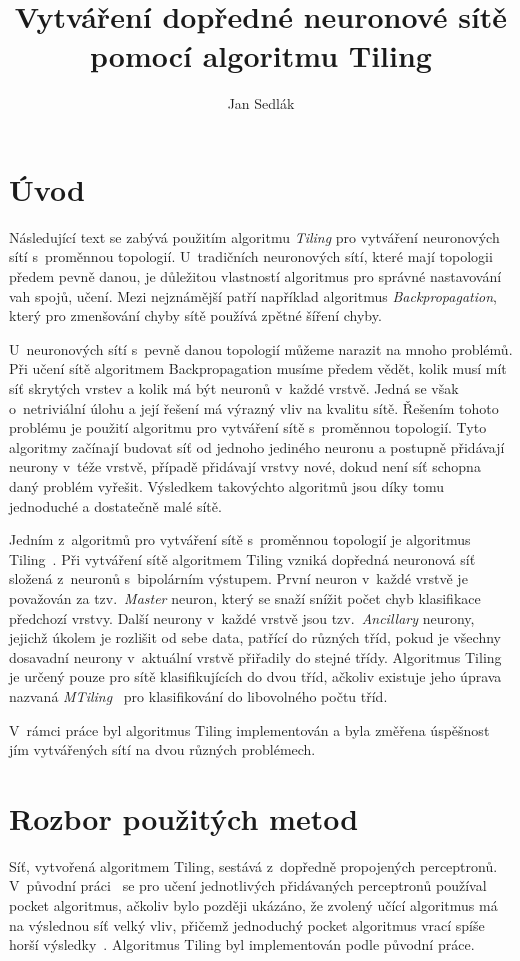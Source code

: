 \documentclass[a4paper, 11pt]{article}
\author{Jan Sedlák}
\title{Vytváření dopředné neuronové sítě pomocí algoritmu Tiling}
\begin{document}
\maketitle
\section{Úvod}
Následující text se zabývá použitím algoritmu \emph{Tiling} pro vytváření neuronových sítí s~proměnnou topologií. U~tradičních neuronových sítí, které mají topologii předem pevně danou, je důležitou vlastností algoritmus pro správné nastavování vah spojů, učení. Mezi nejznámější patří například algoritmus \emph{Backpropagation}, který pro zmenšování chyby sítě používá zpětné šíření chyby.

U~neuronových sítí s~pevně danou topologií můžeme narazit na mnoho problémů. Při učení sítě algoritmem Backpropagation musíme předem vědět, kolik musí mít síť skrytých vrstev a kolik má být neuronů v~každé vrstvě. Jedná se však o~netriviální úlohu a její řešení má výrazný vliv na kvalitu sítě. Řešením tohoto problému je použití algoritmu pro vytváření sítě s~proměnnou topologií. Tyto algoritmy začínají budovat síť od jednoho jediného neuronu a postupně přidávají neurony v~téže vrstvě, případě při\-dá\-va\-jí vrstvy nové, dokud není síť schopna daný problém vyřešit. Výsledkem takovýchto algoritmů jsou díky tomu jednoduché a dostatečně malé sítě.

Jedním z~algoritmů pro vytváření sítě s~proměnnou topologií je algoritmus Tiling~\cite{mezard}. Při vytváření sítě algoritmem Tiling vzniká dopředná neuronová síť složená z~neuronů s~bipolárním výstupem. První neuron v~každé vrstvě je považován za tzv.\ \emph{Master} neuron, který se snaží snížit počet chyb klasifikace předchozí vrstvy. Další neurony v~každé vrstvě jsou tzv.\ \emph{Ancillary} neurony, jejichž úkolem je rozlišit od sebe data, patřící do různých tříd, pokud je všechny dosavadní neurony v~aktuální vrstvě přiřadily do stejné třídy. Algoritmus Tiling je určený pouze pro sítě klasifikujících do dvou tříd, ačkoliv existuje jeho úprava nazvaná \emph{MTiling}~\cite{mtiling} pro klasifikování do libovolného počtu tříd.

V~rám\-ci práce byl algoritmus Tiling implementován a byla změřena úspěšnost jím vytvářených sítí na dvou různých problémech.

\section{Rozbor použitých metod}
Síť, vytvořená algoritmem Tiling, sestává z~dopředně propojených per\-cep\-tro\-nů. V~původní práci~\cite{mezard} se pro učení jednotlivých přidávaných perceptronů používal pocket algoritmus, ačkoliv bylo později ukázáno, že zvolený učící algoritmus má na výslednou síť velký vliv, přičemž jednoduchý pocket algoritmus vrací spíše horší výsledky~\cite{twovariants}. Algoritmus Tiling byl implementován podle původní práce.
\end{document}
